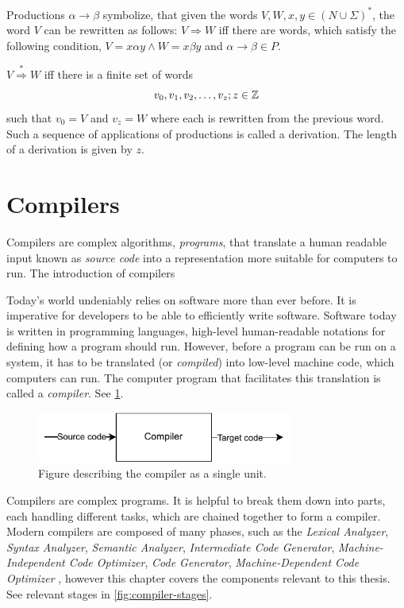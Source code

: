 Productions $\alpha \rightarrow \beta$ symbolize, that given the words $V,W,x,y \in \left( N \cup \Sigma \right)^{*}$, the word $V$ can be rewritten as follows:
$V \Rightarrow W$ iff there are words, which satisfy the following condition, $V=x\alpha y \wedge W=x\beta y$ and $\alpha \rightarrow \beta \in P$.

\begin{definition}[Derivation]
\label{def:derivation}
$V \stackrel{*}{\Rightarrow}  W$ iff there is a finite set of words 
$$ v_0, v_1, v_2, \dots, v_z;\medskip z \in \mathbb{Z}$$
such that $v_0 = V$ and $v_z = W$ where each is rewritten from the previous word. Such a sequence of applications of productions is called a derivation.
The length of a derivation is given by $z$. 
\end{definition}




\section{Compilers}


Compilers are complex algorithms, \emph{programs}, that translate a human readable input known as \emph{source code} into a representation more suitable for computers to run. The introduction of compilers 


Today's world undeniably relies on software more than ever before. It is imperative for developers to be able to efficiently write software. Software today is written in programming languages, high-level human-readable notations for defining how a program should run. However, before a program can be run on a system, it has to be translated (or \emph{compiled}) into low-level machine code, which computers can run. The computer program that facilitates this translation is called a \emph{compiler}. See \ref{fig:compiler}.

\begin{figure}
  \caption{Figure describing the compiler as a single unit.}
  \label{fig:compiler}
  \centering
  \includegraphics[width=0.75\textwidth]{figures/compiler.pdf}
\end{figure}



Compilers are complex programs. It is helpful to break them down into parts, each handling different tasks, which are chained together to form a compiler. Modern compilers are composed of many phases, such as the \emph{Lexical Analyzer}, \emph{Syntax Analyzer}, \emph{Semantic Analyzer}, \emph{Intermediate Code Generator}, \emph{Machine-Independent Code Optimizer}, \emph{Code Generator}, \emph{Machine-Dependent Code Optimizer} \cite{dragon}, however this chapter covers the components relevant to this thesis. See relevant stages in \ref{fig:compiler-stages}.


